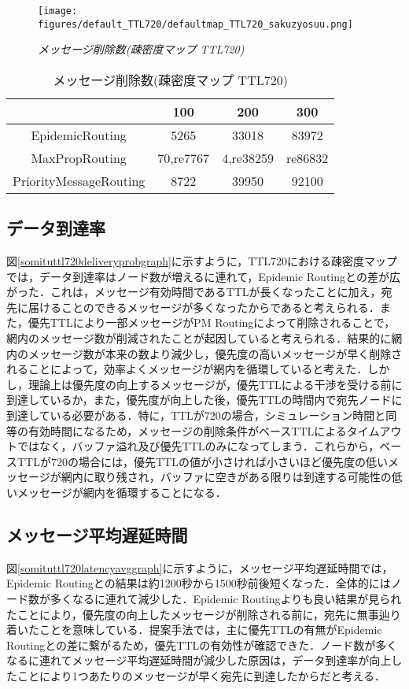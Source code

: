 \documentclass[11pt]{icsthesis}
\begin{document}
\begin{figure}[h]
\centering
\texttt{[image: figures/default\_TTL720/defaultmap\_TTL720\_sakuzyosuu.png]}
\caption[]{\it{メッセージ削除数(疎密度マップ TTL720)}}
\label{somituttl720droppedgraph}
\end{figure}

\begin{table}[H]
 \begin{center}
      \caption[]{メッセージ削除数(疎密度マップ TTL720)}
      \label{somituTtl720dropped}
      \begin{tabular}{|c|c|c|c|}
\hline
&100&200&300\\
\hline
EpidemicRouting&5265&33018&83972\\
\hline
MaxPropRouting&70,re7767&4,re38259&re86832\\
\hline
PriorityMessageRouting&8722&39950&92100\\
\hline
      \end{tabular}
    \end{center}
\end{table}

\subsection{データ到達率}
図\ref{somituttl720deliveryprobgraph}に示すように，TTL720における疎密度マップでは，データ到達率はノード数が増えるに連れて，Epidemic Routingとの差が広がった．これは，メッセージ有効時間であるTTLが長くなったことに加え，宛先に届けることのできるメッセージが多くなったからであると考えられる．また，優先TTLにより一部メッセージがPM Routingによって削除されることで，網内のメッセージ数が削減されたことが起因していると考えられる．結果的に網内のメッセージ数が本来の数より減少し，優先度の高いメッセージが早く削除されることによって，効率よくメッセージが網内を循環していると考えた．しかし，理論上は優先度の向上するメッセージが，優先TTLによる干渉を受ける前に到達しているか，また，優先度が向上した後，優先TTLの時間内で宛先ノードに到達している必要がある．特に，TTLが720の場合，シミュレーション時間と同等の有効時間になるため，メッセージの削除条件がベースTTLによるタイムアウトではなく，バッファ溢れ及び優先TTLのみになってしまう．これらから，ベースTTLが720の場合には，優先TTLの値が小さければ小さいほど優先度の低いメッセージが網内に取り残され，バッファに空きがある限りは到達する可能性の低いメッセージが網内を循環することになる．

\subsection{メッセージ平均遅延時間}
図\ref{somituttl720latencyavggraph}に示すように，メッセージ平均遅延時間では，Epidemic Routingとの結果は約1200秒から1500秒前後短くなった．全体的にはノード数が多くなるに連れて減少した．Epidemic Routingよりも良い結果が見られたことにより，優先度の向上したメッセージが削除される前に，宛先に無事辿り着いたことを意味している．提案手法では，主に優先TTLの有無がEpidemic Routingとの差に繋がるため，優先TTLの有効性が確認できた．ノード数が多くなるに連れてメッセージ平均遅延時間が減少した原因は，データ到達率が向上したことにより1つあたりのメッセージが早く宛先に到達したからだと考える．
\end{document}
